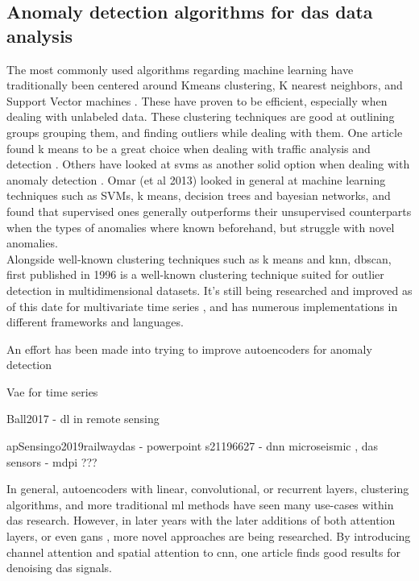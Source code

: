 \subsection{Anomaly detection algorithms for \acrshort{das} data analysis}

The most commonly used algorithms regarding machine learning have traditionally been centered around Kmeans clustering, K nearest neighbors, and  Support Vector machines \cite{10.14778/3538598.3538602, 10.1145/3444690}. These have proven to be efficient, especially when dealing with unlabeled data. These clustering techniques are good at outlining groups grouping them, and finding outliers while dealing with them. One article found k means to be a great choice when dealing with traffic analysis and detection \cite{7507933}. Others have looked at svms as another solid option when dealing with anomaly detection \cite{10.1007/978-3-540-28647-9_97}. Omar (et al 2013) \cite{omar2013machine} looked in general at machine learning techniques such as SVMs, k means, decision trees and bayesian networks, and found that supervised ones generally outperforms their unsupervised counterparts when the types of anomalies where known beforehand, but struggle with novel anomalies. \\ 

Alongside well-known clustering techniques such as k means and knn, \acrfull{dbscan}, first published in 1996 \cite{10.5555/3001460.3001507} is a well-known clustering technique suited for outlier detection in multidimensional datasets. It's still being researched and improved as of this date for multivariate time series \cite{waltz2024time}, and has numerous implementations in different frameworks and languages.  


An effort has been made into trying to improve autoencoders for anomaly detection \cite{tan2023improving}

Vae for time series \cite{desai2021timevae}


Ball2017 - dl in remote sensing

apSensingo2019railwaydas - powerpoint
s21196627 - dnn microseismic , das
sensors - mdpi ???

In general, autoencoders with linear, convolutional, or recurrent layers, clustering algorithms, and more traditional \acrshort{ml} methods have seen many use-cases within \acrshort{das} research. However, in later years with the later additions of both attention layers, or even \acrshort{gan}s \cite{goodfellow2014generative, goodfellow2016nips}, more novel approaches are being researched. By introducing channel attention and spatial attention to \acrshort{cnn}, one article \cite{eage:/content/journals/10.1111/1365-2478.13355} finds good results for denoising \acrshort{das} signals. 


